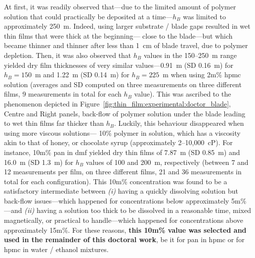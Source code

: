 At first, it was readily observed that---due to the limited amount of polymer solution that could practically be deposited at a time---$h_B$ was limited to approximately 250~\textmu{}m. Indeed, using larger substrate / blade gaps resulted in wet thin films that were thick at the beginning---\ie{} close to the blade---but which became thinner and thinner after less than 1~cm of blade travel, due to polymer depletion. Then, it was also observed that $h_B$ values in the 150--250~\textmu{}m range yielded dry film thicknesses of very similar values---0.91~\textmu{}m (SD 0.16~\textmu{}m) for $h_B=150$~\textmu{}m and 1.22~\textmu{}m (SD 0.14~\textmu{}m) for $h_B=225$~\textmu{}m when using 2m\% \gls{hpmc} solution (averages and SD computed on three measurements on three different films, 9 measurements in total for each $h_B$ value). This was ascribed to the phenomenon depicted in Figure~\ref{fig:thin_film:experimental:doctor_blade}, Centre and Right panels, \ie{} back-flow of polymer solution under the blade leading to wet thin films far thicker than $h_B$. Luckily, this behaviour disappeared when using more viscous solutions---\eg{} 10\% polymer in solution, which has a viscosity akin to that of honey, or chocolate syrup (approximately 2--10,000~cP). For instance, 10m\% \gls{pan} in \gls{dmf} yielded dry thin films of 7.87~\textmu{}m (SD 0.85~\textmu{}m) and 16.0~\textmu{}m (SD 1.3~\textmu{}m) for $h_B$ values of 100 and 200~\textmu{}m, respectively (between 7 and 12 measurements per film, on three different films, 21 and 36 measurements in total for each configuration). This 10m\% concentration was found to be a satisfactory intermediate between \textit{(i)} having a quickly dissolving solution but back-flow issues---which happened for concentrations below approximately 5m\%---and \textit{(ii)} having a solution too thick to be dissolved in a reasonable time, mixed magnetically, or practical to handle---which happened for concentrations above approximately 15m\%. For these reasons, \textbf{this 10m\% value was selected and used in the remainder of this doctoral work}, be it for \gls{pan} in \gls{hpmc} or for \gls{hpmc} in water / ethanol mixtures.

